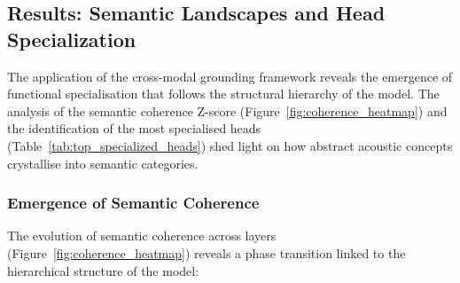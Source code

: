 \subsection{Results: Semantic Landscapes and Head Specialization}
\label{sec:specialization_results}
 
The application of the cross-modal grounding framework reveals the emergence
of functional specialisation that follows the structural hierarchy of the
model. The analysis of the semantic coherence Z-score
(Figure~\ref{fig:coherence_heatmap}) and the identification of the most
specialised heads (Table~\ref{tab:top_specialized_heads}) shed light on how
abstract acoustic concepts crystallise into semantic categories.
 
\subsubsection{Emergence of Semantic Coherence}
 
The evolution of semantic coherence across layers
(Figure~\ref{fig:coherence_heatmap}) reveals a phase transition linked to
the hierarchical structure of the model:
 
